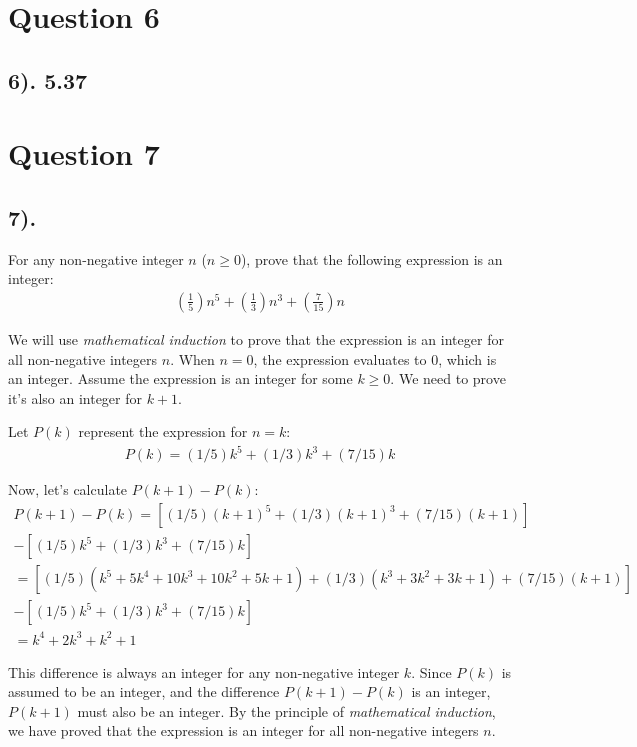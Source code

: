 \documentclass[12pt]{article}
\begin{document}
\section*{Question 6}
\subsection*{6). 5.37}

\section*{Question 7}
\subsection*{7).}
For any non-negative integer $n$ ($n \geq 0$), prove that the following expression is an integer:
\begin{gather*}
    (\frac{1}{5})n^5 + (\frac{1}{3})n^3 + (\frac{7}{15})n
\end{gather*}

We will use \textit{mathematical induction} to prove that the expression is an integer for all non-negative integers $n$.
When $n = 0$, the expression evaluates to 0, which is an integer.
Assume the expression is an integer for some $k \geq 0$. We need to prove it's also an integer for $k + 1$.

Let $P(k)$ represent the expression for $n = k$:
\begin{gather*}
    P(k) = (1/5)k^5 + (1/3)k^3 + (7/15)k
\end{gather*}

Now, let's calculate $P(k+1) - P(k)$:
\begin{gather*}
    P(k+1) - P(k) = [(1/5){(k+1)}^5 + (1/3){(k+1)}^3 + (7/15)(k+1)] \\
    - [(1/5)k^5 + (1/3)k^3 + (7/15)k] \\
    = [(1/5)(k^5 + 5k^4 + 10k^3 + 10k^2 + 5k + 1) + (1/3)(k^3 + 3k^2 + 3k + 1) + (7/15)(k+1)] \\
    - [(1/5)k^5 + (1/3)k^3 + (7/15)k] \\
    = k^4 + 2k^3 + k^2 + 1
\end{gather*}

This difference is always an integer for any non-negative integer $k$. Since $P(k)$ is assumed to be an integer, and the difference $P(k+1) - P(k)$ is an integer, $P(k+1)$ must also be an integer.
By the principle of \textit{mathematical induction}, we have proved that the expression is an integer for all non-negative integers $n$. \\
\end{document}
